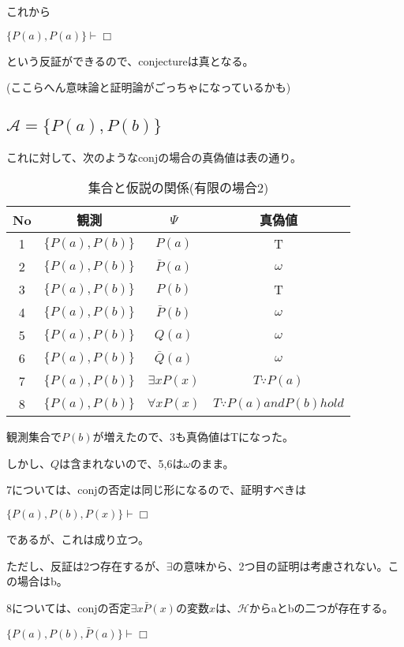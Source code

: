 \documentclass[10pt, oneside]{jarticle}   	%
\theoremstyle{definition}
\newcommand{\undet}{\omega}
\newcommand{\cont}{\Box}
\newcommand{\eset}[1]{\{{#1}\}}
\begin{document}
これから

$\eset{P(a), P(a)} \vdash \cont$ 

という反証ができるので、conjectureは真となる。

(ここらへん意味論と証明論がごっちゃになっているかも)


\subsection{$\mathcal{A}=\eset{P(a), P(b)}$}
これに対して、次のようなconjの場合の真偽値は表の通り。

\begin{table}[htbp]
 \centering
 \begin{tabular}{|c|c|c|c|}\hline
   No & 観測 & $\Psi$ & 真偽値 \\ \hline
   1 & $\eset{P(a), P(b)}$ & $P(a)$ & T \\ \hline
   2 & $\eset{P(a), P(b)}$ & $\bar P(a)$ & $\undet$  \\ \hline
   3 & $\eset{P(a), P(b)}$ & $P(b)$ & T \\ \hline
   4 & $\eset{P(a), P(b)}$ & $\bar P(b)$ & $\undet$  \\ \hline
   5 & $\eset{P(a), P(b)}$ & $Q(a)$ & $\undet$ \\ \hline
   6 & $\eset{P(a), P(b)}$ & $\bar Q(a)$ & $\undet$ \\ \hline
   7 & $\eset{P(a), P(b)}$ & $\exists x P(x)$ & $T \because P(a)$ \\ \hline
   8 & $\eset{P(a), P(b)}$ & $\forall x P(x)$ & $T \because  P(a) and P(b) hold$ \\ \hline
 \end{tabular}
 \caption{集合と仮説の関係(有限の場合2)}
 \label{tab:ex0102}
\end{table}

観測集合で$P(b)$が増えたので、3も真偽値はTになった。

しかし、$Q$は含まれないので、5,6は$\undet$のまま。

7については、conjの否定は同じ形になるので、証明すべきは

$\eset{P(a), P(b), P(x)} \vdash \cont$ 

であるが、これは成り立つ。

ただし、反証は2つ存在するが、$\exists$の意味から、2つ目の証明は考慮されない。この場合はb。

8については、conjの否定$\exists x \bar P(x)$の変数$x$は、$\mathcal{H}$からaとbの二つが存在する。

$\{P(a), P(b), \bar P(a)\} \vdash \cont$
\end{document}
